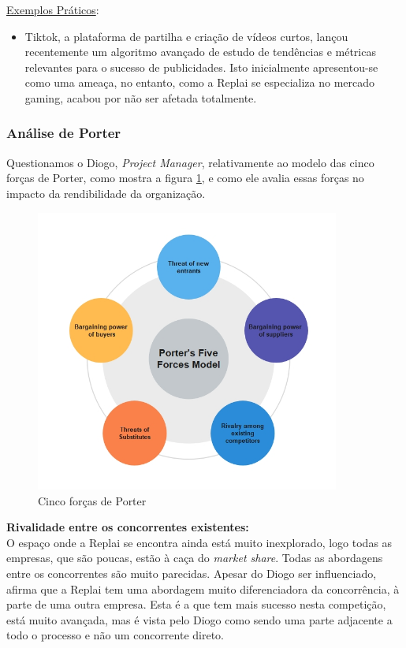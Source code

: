 \underline{Exemplos Práticos}:
\begin{itemize}
    \item Tiktok, a plataforma de partilha e criação de vídeos curtos, lançou recentemente um algoritmo avançado de estudo de tendências e métricas relevantes para o sucesso de publicidades. Isto inicialmente apresentou-se como uma ameaça, no entanto, como a Replai se especializa no mercado gaming, acabou por não ser afetada totalmente.
\end{itemize}
\newpage
\subsubsection{Análise de Porter}
Questionamos o Diogo, \textit{Project Manager}, relativamente ao modelo das cinco forças de Porter, como mostra a figura \ref{fig:Porter}, e como ele avalia essas forças no impacto da rendibilidade da organização.

\begin{figure}[ht]
    \centering
        \includegraphics[width=10cm]{images/porters-five-forces-model.jpg}
        \caption{Cinco forças de Porter}
        \label{fig:Porter}
\end{figure}

\noindent\textbf{Rivalidade entre os concorrentes existentes:}\\

O espaço onde a Replai se encontra ainda está muito inexplorado, logo todas as empresas, que são poucas, estão à caça do \textit{market share}. Todas as abordagens entre os concorrentes são muito parecidas. Apesar do Diogo ser influenciado, afirma que a Replai tem uma abordagem muito diferenciadora da concorrência, à parte de uma outra empresa. Esta é a que tem mais sucesso nesta competição, está muito avançada, mas é vista pelo Diogo como sendo uma parte adjacente a todo o processo e não um concorrente direto. 

